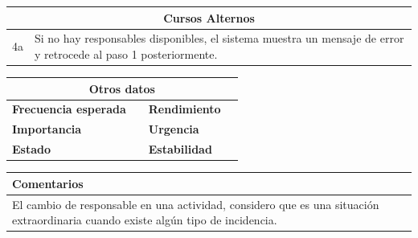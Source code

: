 \vspace{0.2cm}

\begin{table}[h!]
\centering
\begin{tabularx}{\textwidth}{|c|X|}
\hline
\multicolumn{2}{|c|}{\cellcolor[HTML]{F2F2F2}\textbf{Cursos Alternos}} \\ \hline
4a & Si no hay responsables disponibles, el sistema muestra un mensaje de error y retrocede al paso 1 posteriormente. \\ \hline
\end{tabularx}
\end{table}

\vspace{0.2cm}

\begin{table}[h!]
\centering
\begin{tabularx}{\textwidth}{|X|X|X|X|}
\hline
\multicolumn{4}{|c|}{\cellcolor[HTML]{F2F2F2}\textbf{Otros datos}} \\ \hline
\textbf{Frecuencia esperada} &  & \textbf{Rendimiento} &  \\ \hline
\textbf{Importancia} &  & \textbf{Urgencia} &  \\ \hline
\textbf{Estado} &  & \textbf{Estabilidad} &  \\ \hline
\end{tabularx}
\end{table}

\vspace{0.2cm}

\begin{table}[h!]
\centering
\begin{tabularx}{\textwidth}{|X|}
\hline
\cellcolor[HTML]{F2F2F2}\textbf{Comentarios} \\ \hline
El cambio de responsable en una actividad, considero que es una situación extraordinaria cuando existe algún tipo de incidencia. \\ \hline
\end{tabularx}
\end{table}


